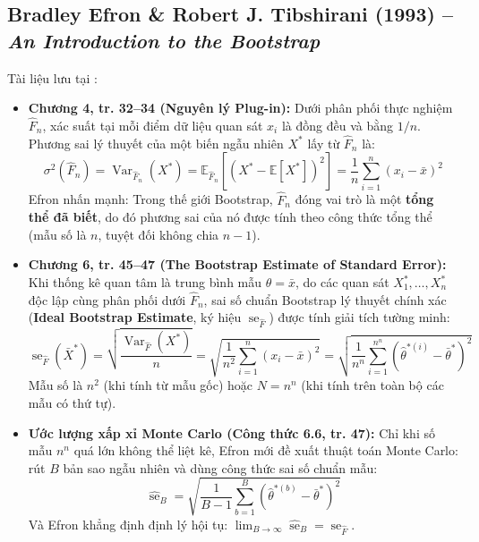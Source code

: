 \documentclass[10pt,a4paper]{article}
\begin{document}
\subsection{Bradley Efron \& Robert J. Tibshirani (1993) -- \textit{An Introduction to the Bootstrap}}
Tài liệu lưu tại :
\begin{itemize}
    \item \textbf{Chương 4, tr. 32--34 (Nguyên lý Plug-in):}
    Dưới phân phối thực nghiệm $\hat F_n$, xác suất tại mỗi điểm dữ liệu quan sát $x_i$ là đồng đều và bằng $1/n$. Phương sai lý thuyết của một biến ngẫu nhiên $X^*$ lấy từ $\hat F_n$ là:
    \begin{equation}
        \sigma^2(\hat F_n) = \operatorname{Var}_{\hat F_n}(X^*) = \mathbb{E}_{\hat F_n}[(X^* - \mathbb{E}[X^*])^2] = \frac{1}{n}\sum_{i=1}^n (x_i - \bar x)^2
    \end{equation}
    Efron nhấn mạnh: Trong thế giới Bootstrap, $\hat F_n$ đóng vai trò là một \textbf{tổng thể đã biết}, do đó phương sai của nó được tính theo công thức tổng thể (mẫu số là $n$, tuyệt đối không chia $n-1$).
    
    \item \textbf{Chương 6, tr. 45--47 (The Bootstrap Estimate of Standard Error):}
    Khi thống kê quan tâm là trung bình mẫu $\hat\theta = \bar x$, do các quan sát $X_1^*, \dots, X_n^*$ độc lập cùng phân phối dưới $\hat F_n$, sai số chuẩn Bootstrap lý thuyết chính xác (\textbf{Ideal Bootstrap Estimate}, ký hiệu $\operatorname{se}_{\hat F}$) được tính giải tích tường minh:
    \begin{equation}
        \operatorname{se}_{\hat F}(\bar X^*) = \sqrt{\frac{\operatorname{Var}_{\hat F}(X^*)}{n}} = \sqrt{\frac{1}{n^2}\sum_{i=1}^n (x_i - \bar x)^2} = \sqrt{\frac{1}{n^n}\sum_{i=1}^{n^n} (\hat\theta^{*(i)} - \bar\theta^*)^2}
    \end{equation}
    Mẫu số là $n^2$ (khi tính từ mẫu gốc) hoặc $N = n^n$ (khi tính trên toàn bộ các mẫu có thứ tự).
    
    \item \textbf{Ước lượng xấp xỉ Monte Carlo (Công thức 6.6, tr. 47):}
    Chỉ khi số mẫu $n^n$ quá lớn không thể liệt kê, Efron mới đề xuất thuật toán Monte Carlo: rút $B$ bản sao ngẫu nhiên và dùng công thức sai số chuẩn mẫu:
    \begin{equation}
        \widehat{\operatorname{se}}_B = \sqrt{\frac{1}{B-1}\sum_{b=1}^B (\hat\theta^{*(b)} - \bar\theta^*)^2}
    \end{equation}
    Và Efron khẳng định định lý hội tụ: $\lim_{B\to\infty} \widehat{\operatorname{se}}_B = \operatorname{se}_{\hat F}$.
\end{itemize}
\end{document}
